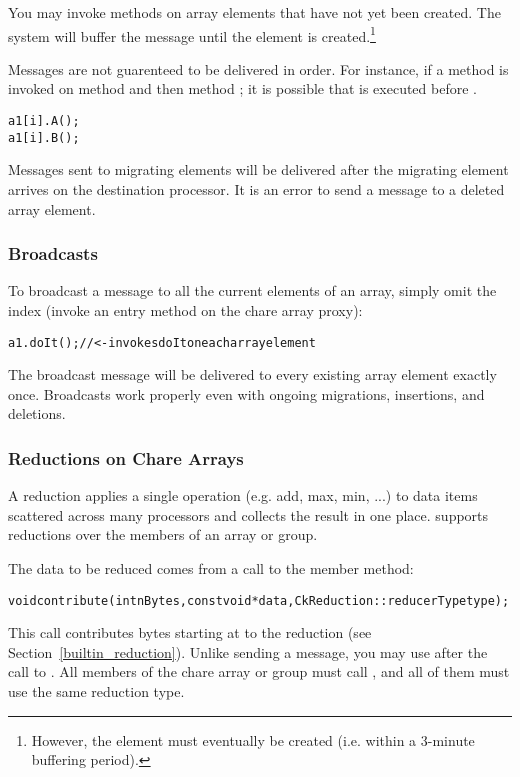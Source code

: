 You may invoke methods on array elements that have not yet been created. The
system will buffer the message until the element is created.\footnote{However,
  the element must eventually be created (i.e. within a 3-minute buffering
  period).}

Messages are not guarenteed to be delivered in order. For instance, if a method
is invoked on method  and then method ; it is possible that  is
executed before .
%
\begin{alltt}
a1[i].A();
a1[i].B();
\end{alltt}

Messages sent to migrating elements will be delivered after the migrating
element arrives on the destination processor. It is an error to send a message
to a deleted array element.

\subsubsection{Broadcasts}

To  broadcast a message to all the current elements of
an array, simply omit the index (invoke an entry method on the chare array
proxy):
%
\begin{alltt}
a1.doIt(); //<- invokes doIt on each array element
\end{alltt}
%
The broadcast message will be delivered to every existing array element exactly
once. Broadcasts work properly even with ongoing migrations, insertions, and
deletions.

\subsubsection{Reductions on Chare Arrays}
\label{reductions}

A reduction applies a single operation (e.g. add,
max, min, ...) to data items scattered across many processors and
collects the result in one place.  \charmpp{} supports reductions
over the members of an array or group.

The data to be reduced comes from a call to the member  
method:
\begin{alltt}
void contribute(int nBytes, const void *data, CkReduction::reducerType type);
\end{alltt}

This call contributes  bytes starting at  to the
reduction  (see Section~\ref{builtin_reduction}).  Unlike sending a
message, you may use  after the call to .  All
members of the chare array or group must call , 
and all of them must use the same reduction type.  


